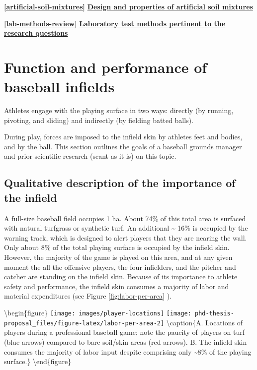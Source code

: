 \documentclass[
]{book}
\begin{document}
\textbf{\ref{artificial-soil-mixtures}} \protect\hyperlink{artificial-soil-mixtures}{\textbf{Design and properties of artificial soil mixtures}}

\textbf{\ref{lab-methods-review}} \protect\hyperlink{lab-methods-review}{\textbf{Laboratory test methods pertinent to the research questions}}

\hypertarget{infield-performance}{%
\section{Function and performance of baseball infields}\label{infield-performance}}

Athletes engage with the playing surface in two ways: directly (by running, pivoting, and sliding) and indirectly (by fielding batted balls).

During play, forces are imposed to the infield skin by athletes feet and bodies, and by the ball. This section outlines the goals of a baseball grounds manager and prior scientific research (scant as it is) on this topic.

\hypertarget{qualitative-description-of-the-importance-of-the-infield}{%
\subsection{Qualitative description of the importance of the infield}\label{qualitative-description-of-the-importance-of-the-infield}}

A full-size baseball field occupies 1 ha. About 74\% of this total area is surfaced with natural turfgrass or synthetic turf. An additional \textasciitilde{} 16\% is occupied by the warning track, which is designed to alert players that they are nearing the wall. Only about 8\% of the total playing surface is occupied by the infield skin. However, the majority of the game is played on this area, and at any given moment the all the offensive players, the four infielders, and the pitcher and catcher are standing on the infield skin. Because of its importance to athlete safety and performance, the infield skin consumes a majority of labor and material expenditures (see Figure \ref{fig:labor-per-area} ).

\textbackslash begin\{figure\}
\texttt{[image: images/player-locations]} \texttt{[image: phd-thesis-proposal\_files/figure-latex/labor-per-area-2]} \textbackslash caption\{A. Locations of players during a professional baseball game; note the paucity of players on turf (blue arrows) compared to bare soil/skin areas (red arrows). B. The infield skin consumes the majority of labor input despite comprising only \textasciitilde8\% of the playing surface.\}\label{fig:labor-per-area}
\textbackslash end\{figure\}
\end{document}
